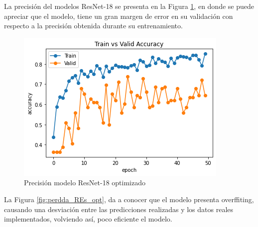 	La precisión del modelos ResNet-18 se presenta en la Figura \ref{fig:preci_RES_OPT}, en donde se puede apreciar que el modelo, tiene un gran margen de error en su validación con respecto a la precisión obtenida durante su entrenamiento.
	
		\begin{figure}[ht]
			\centering
			\includegraphics[scale=0.6]{Figs/512.png}
			\caption{Precisión modelo ResNet-18 optimizado}
			\label{fig:preci_RES_OPT}
		\end{figure}
	
	La Figura \ref{fig:perdda_REs_opt}, da a conocer que el modelo presenta overffiting, causando una desviación entre las predicciones realizadas y los datos reales implementados, volviendo así, poco eficiente el modelo.	
	
